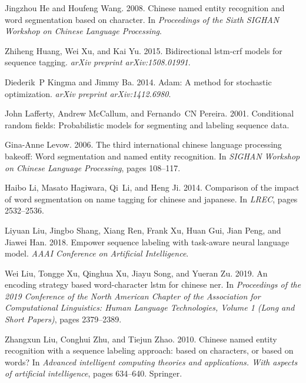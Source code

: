 \documentclass[11pt,a4paper]{article}
\begin{document}
\begin{CJK}{UTF8}{gbsn}
\begin{thebibliography}{35}
Jingzhou He and Houfeng Wang. 2008.
\newblock Chinese named entity recognition and word segmentation based on
  character.
\newblock In \emph{Proceedings of the Sixth SIGHAN Workshop on Chinese Language
  Processing}.

Zhiheng Huang, Wei Xu, and Kai Yu. 2015.
\newblock Bidirectional lstm-crf models for sequence tagging.
\newblock \emph{arXiv preprint arXiv:1508.01991}.

Diederik~P Kingma and Jimmy Ba. 2014.
\newblock Adam: A method for stochastic optimization.
\newblock \emph{arXiv preprint arXiv:1412.6980}.

John Lafferty, Andrew McCallum, and Fernando~CN Pereira. 2001.
\newblock Conditional random fields: Probabilistic models for segmenting and
  labeling sequence data.

Gina-Anne Levow. 2006.
\newblock The third international chinese language processing bakeoff: Word
  segmentation and named entity recognition.
\newblock In \emph{SIGHAN Workshop on Chinese Language Processing}, pages
  108--117.

Haibo Li, Masato Hagiwara, Qi~Li, and Heng Ji. 2014.
\newblock Comparison of the impact of word segmentation on name tagging for
  chinese and japanese.
\newblock In \emph{LREC}, pages 2532--2536.

Liyuan Liu, Jingbo Shang, Xiang Ren, Frank Xu, Huan Gui, Jian Peng, and Jiawei
  Han. 2018.
\newblock Empower sequence labeling with task-aware neural language model.
\newblock \emph{AAAI Conference on Artificial Intelligence}.

Wei Liu, Tongge Xu, Qinghua Xu, Jiayu Song, and Yueran Zu. 2019.
\newblock An encoding strategy based word-character lstm for chinese ner.
\newblock In \emph{Proceedings of the 2019 Conference of the North American
  Chapter of the Association for Computational Linguistics: Human Language
  Technologies, Volume 1 (Long and Short Papers)}, pages 2379--2389.

Zhangxun Liu, Conghui Zhu, and Tiejun Zhao. 2010.
\newblock Chinese named entity recognition with a sequence labeling approach:
  based on characters, or based on words?
\newblock In \emph{Advanced intelligent computing theories and applications.
  With aspects of artificial intelligence}, pages 634--640. Springer.


\end{thebibliography}
\end{CJK}
\end{document}
